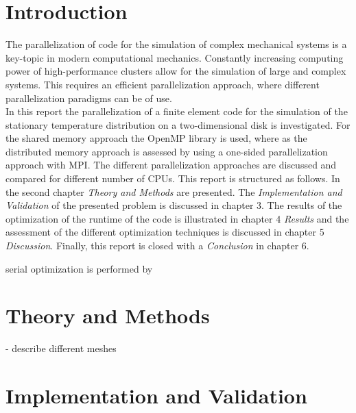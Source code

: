 \documentclass[a4paper, 11pt, oneside]{scrartcl}
\begin{document}



\mabstract{\blindtext}

\section{Introduction}


The parallelization of code for the simulation of complex mechanical systems is a key-topic in modern computational mechanics. Constantly increasing computing power of high-performance clusters allow for the simulation of large and complex systems. This requires an efficient parallelization approach, where different parallelization paradigms can be of use. \\

In this report the parallelization of a finite element code for the simulation of the stationary temperature distribution on a two-dimensional disk is investigated. For the shared memory approach the OpenMP library is used, where as the distributed memory approach is assessed by using a one-sided parallelization approach with MPI. The different parallelization approaches are discussed and compared for different number of CPUs. This report is structured as follows. In the second chapter \textit{Theory and Methods} are presented. The \textit{Implementation and Validation} of the presented problem is discussed in chapter 3. The results of the optimization of the runtime of the code is illustrated in chapter 4 \textit{Results} and the assessment of the different optimization techniques is discussed in chapter 5 \textit{Discussion}. Finally, this report is closed with a \textit{Conclusion} in chapter 6.

serial optimization is performed by  

\section{Theory and Methods}


- describe different meshes

\section{Implementation and Validation}
\end{document}
